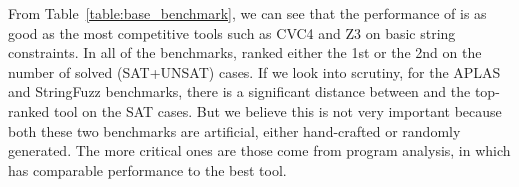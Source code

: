 \begin{table}[h]
\centering
\caption{Results of {\tool}, CVC4, Z3, and Z3-str3 on String-Number Conversion benchmark.}
\label{table:str_int_benchmark}
\end{table}


From Table~\ref{table:base_benchmark}, we can see that the performance of {\tool} is as good as the most competitive tools such as CVC4 and Z3 on basic string constraints. In all of the benchmarks, {\tool} ranked either the 1st or the 2nd on the number of solved (SAT+UNSAT) cases. If we look into scrutiny, for the APLAS and StringFuzz benchmarks, there is a significant distance between {\tool} and the top-ranked tool on the SAT cases. But we believe this is not very important because both these two benchmarks are artificial, either hand-crafted or randomly generated. The more critical ones are those come from program analysis, in which {\tool} has comparable performance to the best tool.

